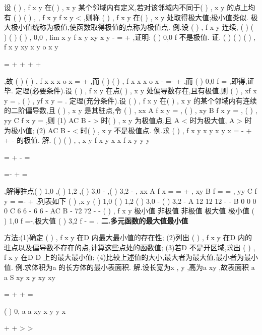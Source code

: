 设
(
)
,
f x y 在(
)
,
x
y
某个邻域内有定义,若对该邻域内不同于(
)
,
x
y
的点上均有
(
)
(
)
,
,
f x y
f x
y
<
,则称
(
)
,
f x y 在(
)
,
x
y
处取得\textcolor{lyred}{极大值};\textcolor{lyred}{极小值}类似. 
极大极小值统称为\textcolor{lyred}{极值},使函数取得极值的点称为\textcolor{lyred}{极值点}. 
\textcolor{lyred}{例}.设
(
)
,
f x y 连续,
(
)
(
)
(
)
(
)
,
0,0
,
lim
x y
f x y
xy
x
y
\to 
-
=
+
,证明:
(
)
0,0
f
不是极值. 
证.
(
)
(
)
(
)
,
f x y
xy
x
y
o
x
y


=
+
+
+
+



,故
(
)
(
)
,
f x x
x
o x
=
+
,而 
(
)
(
)
,
f x
x
x
o x
-
=-
+
,而
(
)
0,0
f
=
,即得,证毕. 
\textcolor{lyred}{定理(必要条件)}.设
(
)
,
f x y 在点(
)
,
x
y
处偏导数存在,且有极值,则 
(
)
,
xf
x
y
=
,
(
)
,
yf
x
y
=
. 
\textcolor{lyred}{定理(充分条件)}.设
(
)
,
f x y 在(
)
,
x
y
的某个邻域内有连续的二阶偏导数,且 
(
)
,
x
y
是其驻点,令
(
)
,
xx
A
f
x
y
=
,
(
)
,
xy
B
f
x
y
=
,
(
)
,
yy
C
f
x
y
=
,则 
(1)
AC
B
-
>
时(
)
,
x
y
为极值点,且
A <
时为极大值,
A >
时为极小值; 
(2)
AC
B
-
<
时(
)
,
x
y
不是极值点. 
\textcolor{lyred}{例}.求
(
)
,
f x y
x
y
x
y
x
=
-
+
+
-
的极值. 
解.
(
)
(
)
,
,
x
y
f
x y
x
x
f
x y
y
y

=
+
-
=

=-
+
=

,解得驻点(
)
1,0 ,(
)
1,2 ,(
)
3,0
-
,(
)
3,2
-
, 
xx
A
f
x
=
=
+
,
xy
B
f
=
=
,
yy
C
f
y
=
=-
+
,列表如下 
(
)
,x y        (
)
1,0        (
)
1,2       (
)
3,0
-
       (
)
3,2
-
A           12          12         12
-
-
B           0           0           0           0 
C           6          6
-           6          6
- 
AC
B
-
        72        72
-
-
(
)
,
f x y       极小值     非极值        非极值       极大值 
极小值
(
)
1,0
f
=-,极大值
(
)
3,2
f -
=
. 
\vspace{4pt}
{\bfseries \textcolor{lyred}{二.多元函数的最大值最小值}}

\textcolor{lyred}{方法}:(1)确定
(
)
,
f x y 在D 内最大最小值的存在性; 
(2)列出
(
)
,
f x y 在D 内的驻点以及偏导数不存在的点,计算这些点处的函数值; 
(3)若D 不是开区域,求出
(
)
,
f x y 在D
D
\partial 
\cap 
上的最大最小值; 
(4)比较上述值的大小,最大者为最大值,最小者为最小值. 
\textcolor{lyred}{例}.求体积为a 的长方体的最小表面积. 
解.设长宽为x , y ,高为a
xy ,故表面积
a
a
S
xy
x
y
xy
xy


=
+
\cdots 
+
\cdots 
=




(
)
0,
a
a
xy
x
y
y
x


+
+
>
>




